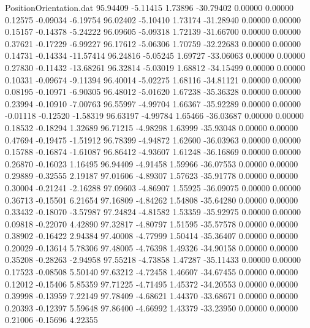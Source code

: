 \begin{filecontents}{PositionOrientation.dat}
  95.94409   -5.11415    1.73896   -30.79402    0.00000    0.00000    0.12575   -0.09034   -6.19754
  96.02402   -5.10410    1.73174   -31.28940    0.00000    0.00000    0.15157   -0.14378   -5.24222
  96.09605   -5.09318    1.72139   -31.66700    0.00000    0.00000    0.37621   -0.17229   -6.99227
  96.17612   -5.06306    1.70759   -32.22683    0.00000    0.00000    0.14731   -0.14334  -11.57414
  96.24816   -5.05245    1.69727   -33.06063    0.00000    0.00000    0.27830   -0.11432  -13.68261
  96.32814   -5.03019    1.68812   -34.15499    0.00000    0.00000    0.10331   -0.09674   -9.11394
  96.40014   -5.02275    1.68116   -34.81121    0.00000    0.00000    0.08195   -0.10971   -6.90305
  96.48012   -5.01620    1.67238   -35.36328    0.00000    0.00000    0.23994   -0.10910   -7.00763
  96.55997   -4.99704    1.66367   -35.92289    0.00000    0.00000   -0.01118   -0.12520   -1.58319
  96.63197   -4.99784    1.65466   -36.03687    0.00000    0.00000    0.18532   -0.18294    1.32689
  96.71215   -4.98298    1.63999   -35.93048    0.00000    0.00000    0.47694   -0.19475   -1.51912
  96.78399   -4.94872    1.62600   -36.03963    0.00000    0.00000    0.15788   -0.16874   -1.61087
  96.86412   -4.93607    1.61248   -36.16869    0.00000    0.00000    0.26870   -0.16023    1.16495
  96.94409   -4.91458    1.59966   -36.07553    0.00000    0.00000    0.29889   -0.32555    2.19187
  97.01606   -4.89307    1.57623   -35.91778    0.00000    0.00000    0.30004   -0.21241   -2.16288
  97.09603   -4.86907    1.55925   -36.09075    0.00000    0.00000    0.36713   -0.15501    6.21654
  97.16809   -4.84262    1.54808   -35.64280    0.00000    0.00000    0.33432   -0.18070   -3.57987
  97.24824   -4.81582    1.53359   -35.92975    0.00000    0.00000    0.09818   -0.22070    4.42890
  97.32817   -4.80797    1.51595   -35.57578    0.00000    0.00000    0.38902   -0.16422    2.94384
  97.40008   -4.77999    1.50414   -35.36407    0.00000    0.00000    0.20029   -0.13614    5.78306
  97.48005   -4.76398    1.49326   -34.90158    0.00000    0.00000    0.35208   -0.28263   -2.94958
  97.55218   -4.73858    1.47287   -35.11433    0.00000    0.00000    0.17523   -0.08508    5.50140
  97.63212   -4.72458    1.46607   -34.67455    0.00000    0.00000    0.12012   -0.15406    5.85359
  97.71225   -4.71495    1.45372   -34.20553    0.00000    0.00000    0.39998   -0.13959    7.22149
  97.78409   -4.68621    1.44370   -33.68671    0.00000    0.00000    0.20393   -0.12397    5.59648
  97.86400   -4.66992    1.43379   -33.23950    0.00000    0.00000    0.21006   -0.15696    4.22355

\end{filecontents}
